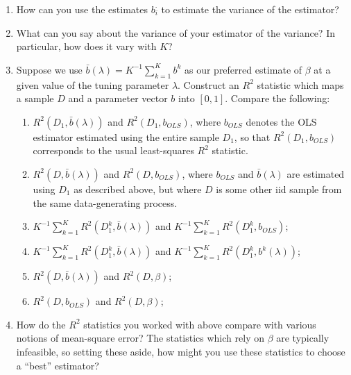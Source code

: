 \documentclass[12pt]{amsart}
\begin{document}
\begin{enumerate}
\item How can you use the estimates \(b_{i}^\cdot\) to estimate the
variance of the estimator?

\item What can you say about the variance of your estimator of the
variance?  In particular, how does it vary with \(K\)?

\item Suppose we use \(\bar{b}(\lambda)=K^{-1}\sum_{k=1}^K b^{k}\) as our
preferred estimate of \(\beta\) at a given value of the tuning
parameter \(\lambda\).  Construct an \(R^2\) statistic which maps a
sample \(D\) and a parameter vector \(b\) into \([0,1]\).  Compare the
following:

\begin{enumerate}
\item \(R^2(D_1,\bar{b}(\lambda))\) and \(R^2(D_1,b_{OLS})\), where
\(b_{OLS}\) denotes the OLS estimator estimated using the entire
sample \(D_1\), so that \(R^2(D_1,b_{OLS})\) corresponds to the
usual least-squares \(R^2\) statistic.

\item \(R^2(D,\bar{b}(\lambda))\) and \(R^2(D,b_{OLS})\), where
\(b_{OLS}\) and \(\bar{b}(\lambda)\) are estimated using \(D_1\) as
described above, but where \(D\) is some other iid sample from
the same data-generating process.

\item \(K^{-1}\sum_{k=1}^K R^2(D_1^k,\bar{b}(\lambda))\) and
\(K^{-1}\sum_{k=1}^K R^2(D_1^k,b_{OLS})\);

\item \(K^{-1}\sum_{k=1}^K R^2(D_1^k,\bar{b}(\lambda))\) and
\(K^{-1}\sum_{k=1}^K R^2(D_1^k,b^{k}(\lambda))\);

\item \(R^2(D,\bar{b}(\lambda))\) and \(R^2(D,\beta)\);

\item \(R^2(D,b_{OLS})\) and \(R^2(D,\beta)\);
\end{enumerate}

\item How do the \(R^2\) statistics you worked with above compare with
various notions of mean-square error?  The statistics which rely
on \(\beta\) are typically infeasible, so setting these aside, how
might you use these statistics to choose a ``best'' estimator?
\end{enumerate}
\end{document}
